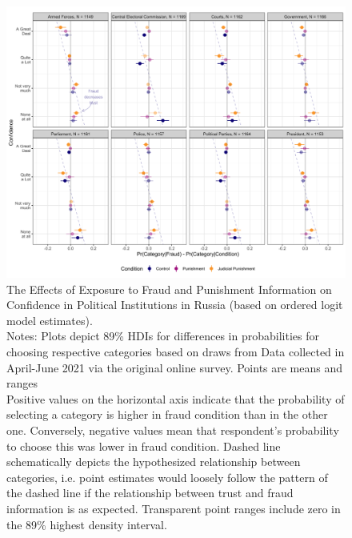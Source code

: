 \documentclass[11pt, ngerman,english,a4]{article}
\begin{document}
\begin{figure}[H]
    \centering
    \includegraphics[width=\linewidth,trim=4 4 4 4,clip]{figs/ru_hdi89.png}
    \caption{The Effects of Exposure to Fraud and Punishment Information on Confidence in Political Institutions in Russia (based on ordered logit model estimates).  \\
     \footnotesize{Notes: Plots depict 89\% HDIs for differences in probabilities for choosing respective categories based on draws from Data collected in April-June 2021 via the original online survey. Points are means and ranges  \\
     Positive values on the horizontal axis indicate that the probability of selecting a category is higher in fraud condition than in the other one. Conversely, negative values mean that respondent's probability to choose this was lower in fraud condition. Dashed line schematically depicts the hypothesized relationship between categories, i.e. point estimates would loosely follow the pattern of the dashed line if the relationship between trust and fraud information is as expected. Transparent point ranges include zero in the 89\% highest density interval.} }
    \singlespacing
    \raggedright
    
    \label{fig:main-ru}
    \end{figure}
\end{document}
